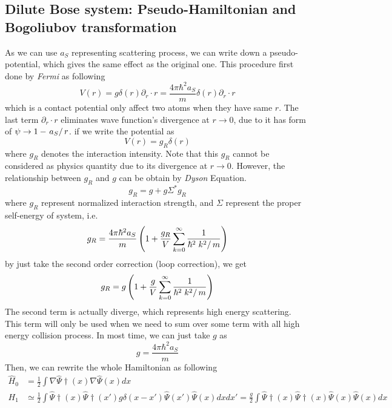 \subsection{Dilute Bose system: Pseudo-Hamiltonian and Bogoliubov transformation}
As we can use $a_S$ representing scattering process, we can write down a pseudo-potential, which gives the same effect as the original one. This procedure first done by \textit{Fermi} as following
\begin{equation}
V(r)=g \delta (r)\partial _r\cdot r=\frac{4\pi\hbar^2a_S}{m}\delta (r)\partial _r\cdot r
\end{equation}
which is a contact potential only affect two atoms when they have same $r$. The last term $\partial _r\cdot r$ eliminates wave function's divergence at $r\to 0$, due to it has form of $\psi \to 1-\left.a_S\right/r$. if we write the potential as
\begin{equation}
V(r)=g_R\delta (r)
\end{equation}
where $g_R$ denotes the interaction intensity. Note that this $g_R$ cannot be considered as physics quantity due to its divergence at $r\to 0$. However, the relationship between $g_R$ and $g$ can be obtain by \textit{Dyson} Equation.
\begin{equation}
g_R=g+g \Sigma ^* g_R
\end{equation}
where $g_R$ represent normalized interaction strength, and $\Sigma$ represent the proper self-energy of system, i.e.
\begin{equation}
g_R=\frac{4\pi  \hbar ^2a_S}{m}\left(1+\frac{g_R}{V}\sum _{k=0}^{\infty } \frac{1}{\hbar ^2\left.k^2\right/m}\right)
\end{equation}
by just take the second order correction (loop correction), we get
\begin{equation}
g_R=g\left(1+\frac{g}{V}\sum _{k=0}^{\infty } \frac{1}{\hbar ^2\left.k^2\right/m}\right)
\end{equation}
The second term is actually diverge, which represents high energy scattering. This term will only be used when we need to sum over some term with all high energy collision process. In most time, we can just take $g$ as
\begin{equation}
g=\frac{4\pi  \hbar ^2a_S}{m}
\end{equation}
Then, we can rewrite the whole Hamiltonian as following
\begin{equation}
\begin{split}
\hat{H}_0&=\frac{1}{2}\int \nabla \hat{\Psi }\dagger(x)\nabla \hat{\Psi }(x)dx\\
H_1&\simeq \frac{1}{2}\int \hat{\Psi }\dagger(x)\hat{\Psi }\dagger(x')g \delta (x-x')\hat{\Psi }(x')\hat{\Psi }(x)dxdx'=\frac{g}{2}\int \hat{\Psi}\dagger(x)\hat{\Psi }\dagger(x)\hat{\Psi }(x)\hat{\Psi }(x)dx
\end{split}
\end{equation}
